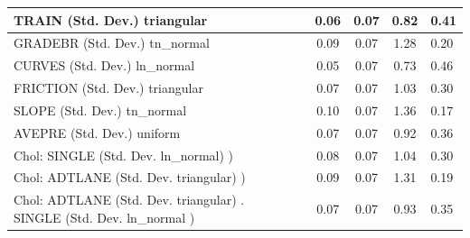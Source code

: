 \begin{table}
\begin{center}
\begin{tabular}{|l|l|c|c|c|l|}
			\hline
			TRAIN (Std. Dev.) triangular &  & 0.06 & 0.07 & 0.82 & 0.41 \\
			\hline
			GRADEBR (Std. Dev.) tn_normal &  & 0.09 & 0.07 & 1.28 & 0.20 \\
			\hline
			CURVES (Std. Dev.) ln_normal &  & 0.05 & 0.07 & 0.73 & 0.46 \\
			\hline
			FRICTION (Std. Dev.) triangular &  & 0.07 & 0.07 & 1.03 & 0.30 \\
			\hline
			SLOPE (Std. Dev.) tn_normal &  & 0.10 & 0.07 & 1.36 & 0.17 \\
			\hline
			AVEPRE (Std. Dev.) uniform &  & 0.07 & 0.07 & 0.92 & 0.36 \\
			\hline
			 Chol: SINGLE (Std. Dev. ln_normal) ) &  & 0.08 & 0.07 & 1.04 & 0.30 \\
			\hline
			 Chol: ADTLANE (Std. Dev. triangular) ) &  & 0.09 & 0.07 & 1.31 & 0.19 \\
			\hline
			 Chol: ADTLANE (Std. Dev. triangular) . SINGLE (Std. Dev.   ln_normal ) &  & 0.07 & 0.07 & 0.93 & 0.35 \\
			\hline
		\end{tabular}
	\end{center}
\end{table}